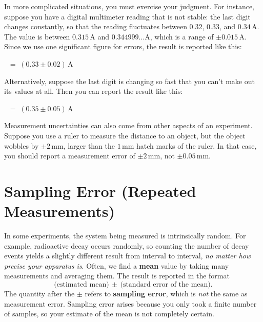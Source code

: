 \documentclass[11pt,a4paper]{article}
\begin{document}
In more complicated situations, you must exercise your judgment.  For
instance, suppose you have a digital multimeter reading that is not
stable: the last digit changes constantly, so that the reading
fluctuates between $0.32$, $0.33$, and $0.34\,\mathrm{A}$.  The value
is between $0.315\,\mathrm{A}$ and $0.344999\dots\mathrm{A}$, which is
a range of $\pm0.015\,\mathrm{A}$.  Since we use one significant
figure for errors, the result is reported like this:
\begin{center}
$\;\;=\; \left(0.33 \pm 0.02\right) \, \mathrm{A}$
\end{center}
Alternatively, suppose the last digit is changing so fast that you
can't make out its values at all.  Then you can report the result like
this:
\begin{center}
$\;\;=\; \left(0.35 \pm 0.05\right) \, \mathrm{A}$
\end{center}

Measurement uncertainties can also come from other aspects of an
experiment.  Suppose you use a ruler to measure the distance to an
object, but the object wobbles by $\pm 2\,\textrm{mm}$, larger than
the $1\,\textrm{mm}$ hatch marks of the ruler.  In that case, you should
report a measurement error of $\pm 2\,\textrm{mm}$, not $\pm
0.05\,\textrm{mm}$.

\section{Sampling Error (Repeated Measurements)}

In some experiments, the system being measured is intrinsically
random.  For example, radioactive decay occurs randomly, so counting
the number of decay events yields a slightly different result from
interval to interval, \textit{no matter how precise your apparatus
  is}.  Often, we find a \textbf{mean} value by taking many
measurements and averaging them.  The result is reported in the format
\begin{equation*}
  \textrm{(estimated mean)} \,\pm\, \textrm{(standard error of the mean)}.
\end{equation*}
The quantity after the $\pm$ refers to \textbf{sampling error}, which
is \textit{not} the same as measurement error.  Sampling error arises
because you only took a finite number of samples, so your estimate of
the mean is not completely certain.
\end{document}
